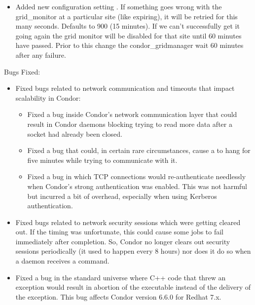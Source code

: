 \begin{itemize}
\item Added new configuration setting
  .  
  If something goes wrong
  with the grid\_monitor at a particular site (like
   expiring), it will be retried
  for this many seconds.  Defaults to 900 (15 minutes).  If we
  can't successfully get it going again the grid monitor will be
  disabled for that site until 60 minutes have passed.  Prior to
  this change the condor\_gridmanager wait 60 minutes after any
  failure.

\end{itemize}



\noindent Bugs Fixed:

\begin{itemize}

\item Fixed bugs related to network communication and timeouts that
  impact scalability in Condor:
  \begin{itemize}
    \item Fixed a bug inside Condor's network communication layer that 
      could result in Condor daemons blocking trying to read more data
      after a socket had already been closed.
    \item Fixed a  bug that could, in certain rare
      circumstances, cause a  to hang for five minutes
      while trying to communicate with it.
    \item Fixed a bug in which TCP connections would re-authenticate
      needlessly when Condor's strong authentication was enabled.
      This was not harmful but incurred a bit of overhead, especially
      when using Kerberos authentication.
  \end{itemize}

\item Fixed bugs related to network security sessions which were
  getting cleared out.
  If the timing was unfortunate, this could cause some jobs to fail
  immediately after completion.
  So, Condor no longer clears out security sessions periodically (it
  used to happen every 8 hours) nor does it do so when a daemon
  receives a  command.

\item Fixed a bug in the standard universe where C++ code that threw an 
exception would result in abortion of the executable instead of the
delivery of the exception. This bug affects Condor version 6.6.0 for
Redhat 7.x.


\end{itemize}
